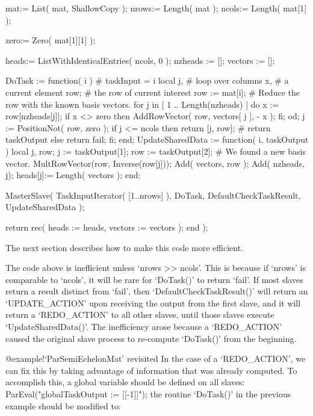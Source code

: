     mat:= List( mat, ShallowCopy );
    nrows:= Length( mat );
    ncols:= Length( mat[1] );

    zero:= Zero( mat[1][1] );

    heads:= ListWithIdenticalEntries( ncols, 0 );
    nzheads := [];
    vectors := [];

    DoTask := function( i ) # taskInput = i
      local j,         # loop over columns
            x,         # a current element
            row;       # the row of current interest
      row := mat[i];
      # Reduce the row with the known basis vectors.
      for j in [ 1 .. Length(nzheads) ] do
          x := row[nzheads[j]];
          if x <> zero then
              AddRowVector( row, vectors[ j ], - x );
          fi;
      od;
      j := PositionNot( row, zero );
      if j <= ncols then return [j, row]; # return taskOutput
      else return fail; fi;
    end;
    UpdateSharedData := function( i, taskOutput )
      local j, row;
      j := taskOutput[1];
      row := taskOutput[2];
      # We found a new basis vector.
      MultRowVector(row, Inverse(row[j]));
      Add( vectors, row );
      Add( nzheads, j);
      heads[j]:= Length( vectors );
    end;
    
    MasterSlave( TaskInputIterator( [1..nrows] ), DoTask, DefaultCheckTaskResult,
                  UpdateSharedData );

    return rec( heads   := heads,
                vectors := vectors );
end );
\endexample

The next section describes how to make this code more efficient.


The code above is inefficient unless `nrows >> ncols'.  This is
because if `nrows' is comparable to `ncols', it will be rare for
`DoTask()' to return `fail'.  If most slaves return a result distinct
from `fail', then `DefaultCheckTaskResult()' will return an
`UPDATE_ACTION' upon receiving the output from the first slave, and it
will return a `REDO_ACTION' to all other slaves, until those slaves
execute `UpdateSharedData()'.  The inefficiency arose because a
`REDO_ACTION' caused the original slave process to re-compute
`DoTask()' from the beginning.

%
{@example!\noexpand`ParSemiEchelonMat' revisited}
In the case of a `REDO_ACTION', we can fix this by taking advantage of
information that was already computed.  To accomplish this, a global
variable should be defined on all slaves:
\beginexample
ParEval("globalTaskOutput := [[-1]]");
\endexample
the routine `DoTask()' in the previous example should be modified to:

